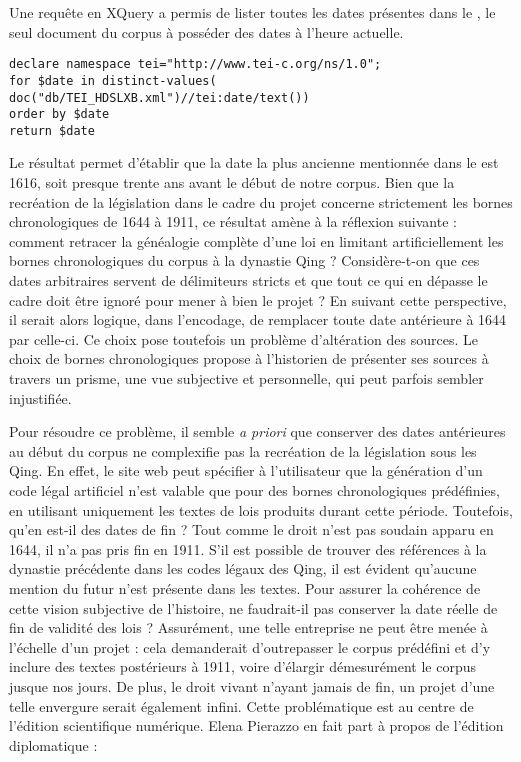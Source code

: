 Une requête en XQuery a permis de lister toutes les dates présentes dans le \huidian, le seul document du corpus à posséder des dates à l'heure actuelle. 
\bigskip
\begin{verbatim}
declare namespace tei="http://www.tei-c.org/ns/1.0";
for $date in distinct-values( doc("db/TEI_HDSLXB.xml")//tei:date/text())
order by $date
return $date
\end{verbatim}
\bigskip
Le résultat permet d'établir que la date la plus ancienne mentionnée dans le \huidian est 1616, soit presque trente ans avant le début de notre corpus. Bien que la recréation de la législation dans le cadre du projet \COREL concerne strictement les bornes chronologiques de 1644 à 1911, ce résultat amène à la réflexion suivante : comment retracer la généalogie complète d'une loi en limitant artificiellement les bornes chronologiques du corpus à la dynastie Qing ? Considère-t-on que ces dates arbitraires servent de délimiteurs stricts et que tout ce qui en dépasse le cadre doit être ignoré pour mener à bien le projet ? En suivant cette perspective, il serait alors logique, dans l'encodage, de remplacer toute date antérieure à 1644 par celle-ci. Ce choix pose toutefois un problème d'altération des sources. Le choix de bornes chronologiques propose à l'historien de présenter ses sources à travers un prisme, une vue subjective et personnelle, qui peut parfois sembler injustifiée.

Pour résoudre ce problème, il semble \textit{a priori} que conserver des dates antérieures au début du corpus ne complexifie pas la recréation de la législation sous les Qing. En effet, le site web peut spécifier à l'utilisateur que la génération d'un code légal artificiel n'est valable que pour des bornes chronologiques prédéfinies, en utilisant uniquement les textes de lois produits durant cette période. Toutefois, qu'en est-il des dates de fin ? Tout comme le droit n'est pas soudain apparu en 1644, il n'a pas pris fin en 1911. S'il est possible de trouver des références à la dynastie précédente dans les codes légaux des Qing, il est évident qu'aucune mention du futur n'est présente dans les textes. Pour assurer la cohérence de cette vision subjective de l'histoire, ne faudrait-il pas conserver la date réelle de fin de validité des lois ? Assurément, une telle entreprise ne peut être menée à l'échelle d'un projet : cela demanderait d'outrepasser le corpus prédéfini et d'y inclure des textes postérieurs à 1911, voire d'élargir démesurément le corpus jusque nos jours. De plus, le droit vivant n'ayant jamais de fin, un projet d'une telle envergure serait également infini. Cette problématique est au centre de l'édition scientifique numérique. Elena Pierazzo en fait part à propos de l'édition diplomatique : 

